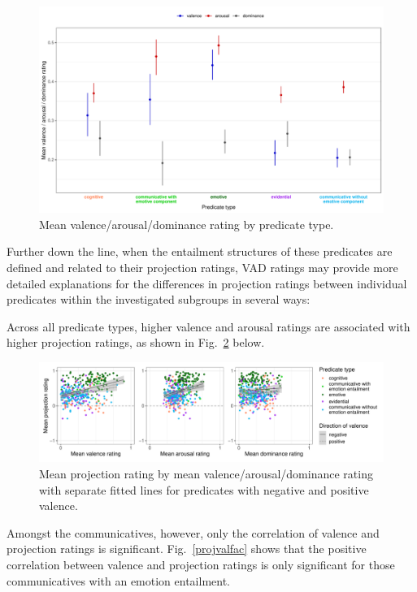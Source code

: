 \documentclass[11pt,fleqn]{article}
\newcommand{\figref}[1]{Fig.~\ref{#1}}
\newcommand{\6}{\mbox{$[\hspace*{-.6mm}[$}}
\newcommand{\9}{\mbox{$]\hspace*{-.6mm}]$}}
\begin{document}
\begin{figure}[H]
	\centering
	\includegraphics[width=1\textwidth]{valence-arousal-dominance-by-predicateType2-2}
	\caption{Mean valence/arousal/dominance rating by predicate type.}
	\label{VADpredtype}
\end{figure}

Further down the line, when the entailment structures of these predicates are defined and related to their projection ratings, VAD ratings may provide more detailed explanations for the differences in projection ratings between individual predicates within the investigated subgroups in several ways:

Across all predicate types, higher valence and arousal ratings are associated with higher projection ratings, as shown in \figref{projVADdir} below.

\begin{figure}[H]
	\centering
	\includegraphics[width=1\textwidth]{projection-by-VAD-with-direction-of-valence}
	\caption{Mean projection rating by mean valence/arousal/dominance rating with separate fitted lines for predicates with negative and positive valence.}
	\label{projVADdir}
\end{figure}

Amongst the communicatives, however, only the correlation of valence and projection ratings is significant. \figref{projvalfac} shows that the positive correlation between valence and projection ratings is only significant for those communicatives with an emotion entailment. 
\end{document}

